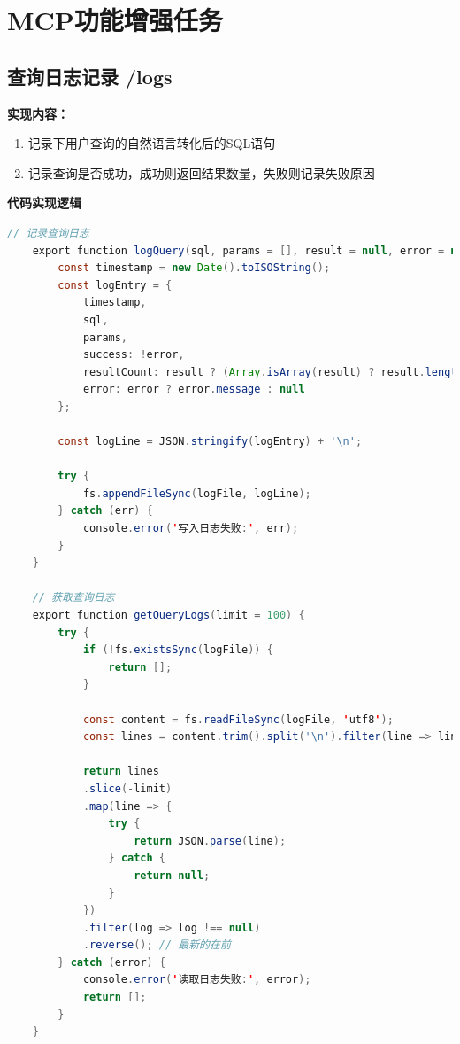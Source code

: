 \documentclass{article}
\begin{document}
	\section{MCP功能增强任务}
	
	\subsection{查询日志记录 /logs}
	
	\textbf{实现内容：}
	
	\begin{enumerate}[noitemsep, label={{\arabic*})}]
		\item 记录下用户查询的自然语言转化后的SQL语句
		\item 记录查询是否成功，成功则返回结果数量，失败则记录失败原因
	\end{enumerate}\textbf{}
	
	\textbf{代码实现逻辑}
	
	\begin{lstlisting}[language=Java, title=日志实现逻辑, tabsize=4]
    // 记录查询日志
    export function logQuery(sql, params = [], result = null, error = null) {
    	const timestamp = new Date().toISOString();
    	const logEntry = {
    		timestamp,
    		sql,
    		params,
    		success: !error,
    		resultCount: result ? (Array.isArray(result) ? result.length : 1) : 0,
    		error: error ? error.message : null
    	};
    	
    	const logLine = JSON.stringify(logEntry) + '\n';
    	
    	try {
    		fs.appendFileSync(logFile, logLine);
    	} catch (err) {
    		console.error('写入日志失败:', err);
    	}
    }
    
    // 获取查询日志
    export function getQueryLogs(limit = 100) {
    	try {
    		if (!fs.existsSync(logFile)) {
    			return [];
    		}
    		
    		const content = fs.readFileSync(logFile, 'utf8');
    		const lines = content.trim().split('\n').filter(line => line);
    		
    		return lines
    		.slice(-limit)
    		.map(line => {
    			try {
    				return JSON.parse(line);
    			} catch {
    				return null;
    			}
    		})
    		.filter(log => log !== null)
    		.reverse(); // 最新的在前
    	} catch (error) {
    		console.error('读取日志失败:', error);
    		return [];
    	}
    }
	\end{lstlisting}
	
\end{document}
